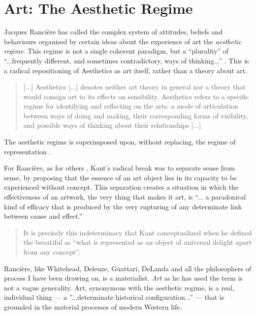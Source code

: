 \section {Art: The Aesthetic Regime}\label {sec:ArtTheAestheticRegime}

    Jacques Rancière has called the complex system of attitudes, beliefs and behaviours organised by certain ideas about the experience of art the \emph{aesthetic regime}. This regime is not a single coherent paradigm, but a “plurality” of “...frequently different, and sometimes contradictory, ways of thinking...” \citep[p.8]{RanciereMdrnTms2022}. This is a radical repositioning of Aesthetics as art itself, rather than a theory about art.

    \begin{quote}
        [...] Aesthetics [...] denotes neither art theory in general nor a theory that would consign art to its effects on sensibility. Aesthetics refers to a specific regime for identifying and reflecting on the arts: a mode of articulation between ways of doing and making, their corresponding forms of visibility, and possible ways of thinking about their relationships [...] \citep[p.10]{RancierPltcsOfThAsthtcs2004}
    \end{quote}

    The aesthetic regime is superimposed upon, without replacing, the regime of representation \citep[p.50]{RancierPltcsOfThAsthtcs2004}.

    For Rancière, as for others \citep[p.123]{DantoEmbdMnngs2007}, Kant's radical break was to separate sense from sense, by proposing that the essence of an art object lies in its capacity to be experienced without concept. This separation creates a situation in which the effectiveness of an artwork, the very thing that makes it art, is “... a paradoxical kind of efficacy that is produced by the very rupturing of any determinate link between cause and effect.” \citep[p.51]{RancierThEmncptdSpcttr2009}

    \begin{quote}	
        It is precisely this indeterminacy that Kant conceptualized when he defined the beautiful as “what is represented as an object of universal delight apart from any concept”. \citep[p.52]{RancierThEmncptdSpcttr2009}
    \end{quote}	

    Rancière, like Whitehead, Deleuze, Guattari, DeLanda and all the philosophers of process I have been drawing on, is a materialist. \emph{Art} as he has used the term is not a vague generality. Art, synonymous with the aesthetic regime, is a real, individual thing — a ”...determinate historical configuration...” \citep[p.24]{RanciereMdrnTms2022} — that is grounded in the material processes of modern Western life.

